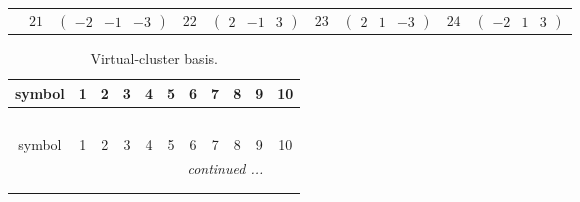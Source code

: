 \documentclass[fleqn,10pt,landscape]{article}
\begin{document}
\begin{itemize}
{\begin{center}
\begin{longtable}{ccccccccc}
& $ 21 $ & $ \begin{pmatrix} -2 & -1 & -3 \end{pmatrix} $ & $ 22 $ & $ \begin{pmatrix} 2 & -1 & 3 \end{pmatrix} $ & $ 23 $ & $ \begin{pmatrix} 2 & 1 & -3 \end{pmatrix} $ & $ 24 $ & $ \begin{pmatrix} -2 & 1 & 3 \end{pmatrix} $ \\
\end{longtable}
\end{center}
\begin{center}
\renewcommand{\arraystretch}{1.7}
\begin{longtable}{ccccccccccc}
\caption{Virtual-cluster basis.}
 \\
 \hline \hline
symbol & 1 & 2 & 3 & 4 & 5 & 6 & 7 & 8 & 9 & 10 \\ \hline \endfirsthead

\multicolumn{10}{l}{\tablename\ \thetable{}} \\
 \hline \hline
symbol & 1 & 2 & 3 & 4 & 5 & 6 & 7 & 8 & 9 & 10 \\ \hline \endhead

 \hline \hline
\multicolumn{10}{r}{\footnotesize\it continued ...} \\ \endfoot

 \hline \hline
\multicolumn{10}{r}{} \\ \endlastfoot


\end{longtable}
\end{center}}
\end{itemize}
\end{document}
